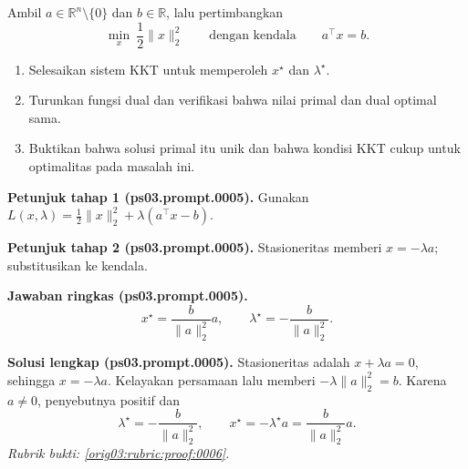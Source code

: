 \begin{exercise}
\label{orig03:ps03:problem:0003}
Ambil $a\in\mathbb{R}^n\setminus\{0\}$ dan $b\in\mathbb{R}$, lalu
pertimbangkan
\[
 \min_x\ \frac12\lVert x\rVert_2^2
 \qquad\text{dengan kendala}\qquad a^\top x=b.
\]
\begin{enumerate}
\item\label{orig03:ps03:prompt:0005}
Selesaikan sistem KKT untuk memperoleh $x^\star$ dan $\lambda^\star$.
\item\label{orig03:ps03:prompt:0006}
Turunkan fungsi dual dan verifikasi bahwa nilai primal dan dual optimal sama.
\item\label{orig03:ps03:prompt:0007}
Buktikan bahwa solusi primal itu unik dan bahwa kondisi KKT cukup untuk
optimalitas pada masalah ini.
\end{enumerate}
\end{exercise}

\par\noindent\textbf{Petunjuk tahap 1 (ps03.prompt.0005).}
Gunakan $L(x,\lambda)=\tfrac12\lVert x\rVert_2^2+
\lambda(a^\top x-b)$.
\label{orig03:ps03:hint1:0005}
\par\noindent\textbf{Petunjuk tahap 2 (ps03.prompt.0005).}
Stasioneritas memberi $x=-\lambda a$; substitusikan ke kendala.
\label{orig03:ps03:hint2:0005}
\par\noindent\textbf{Jawaban ringkas (ps03.prompt.0005).}
\[
 x^\star=\frac{b}{\lVert a\rVert_2^2}a,
 \qquad
 \lambda^\star=-\frac{b}{\lVert a\rVert_2^2}.
\]
\label{orig03:ps03:answer:0005}
\par\noindent\textbf{Solusi lengkap (ps03.prompt.0005).}
Stasioneritas adalah $x+\lambda a=0$, sehingga $x=-\lambda a$.
Kelayakan persamaan lalu memberi
$-\lambda\lVert a\rVert_2^2=b$. Karena $a\neq0$, penyebutnya positif dan
\[
 \lambda^\star=-\frac{b}{\lVert a\rVert_2^2},
 \qquad
 x^\star=-\lambda^\star a=
 \frac{b}{\lVert a\rVert_2^2}a.
\]
\emph{Rubrik bukti: \ref{orig03:rubric:proof:0006}.}
\label{orig03:ps03:solution:0005}

